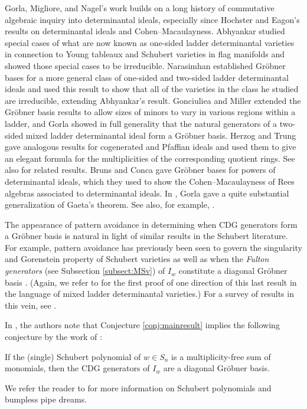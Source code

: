 \documentclass[ALCO,Unicode,published]{cedram}
\begin{document}
Gorla, Migliore, and Nagel's \cite{GMN13} work builds on a long history of commutative algebraic inquiry into determinantal ideals, especially since Hochster and Eagon's \cite{HE} results on determinantal ideals and Cohen--Macaulayness.  Abhyankar \cite{Abh88} studied special cases of what are now known as one-sided ladder determinantal varieties in connection to Young tableaux and Schubert varieties in flag manifolds and showed those special cases to be irreducible.  Narasimhan \cite{Nar86} established Gr\"obner bases for a more general class of one-sided and two-sided ladder determinantal ideals and used this result to show that all of the varieties in the class he studied are irreducible, extending Abhyankar's result.  Gonciuliea and Miller \cite{GM00}  extended the Gr\"obner basis results to allow sizes of minors to vary in various regions within a ladder, and Gorla \cite{Gor07} showed in full generality that the natural generators of a two-sided mixed ladder determinantal ideal form a Gr\"obner basis.  Herzog and Trung \cite{HT92} gave analogous results for cogenerated and Pfaffian ideals and used them to give an elegant formula for the multiplicities of the corresponding quotient rings.  
See also \cite{DNS11} for related results.  Bruns and Conca \cite{BC98} gave Gr\"obner bases for powers of determinantal ideals, which they used to show the Cohen--Macaulayness of Rees algebras associated to determinantal ideals.  In \cite{Gor08}, Gorla gave a quite substantial generalization of Gaeta's theorem.  See also, for example, \cite{Bru91,  CH97, Con98, BRW05}.

The appearance of pattern avoidance in determining when CDG generators form a Gr\"obner basis is natural in light of similar results in the Schubert literature.  For example, pattern avoidance has previously been seen to govern the singularity \cite{LS90} and Gorenstein property \cite{WY06} of Schubert varieties as well as when the \emph{Fulton generators} (see Subsection \ref{subsect:MSv}) of $I_w$ constitute a diagonal Gr\"obner basis \cite{KMY09}.  (Again, we refer to \cite{Gor07} for the first proof of one direction of this last result in the language of mixed ladder determinantal varieties.)  For a survey of results in this vein, see \cite{AB16}.

In \cite{HPW}, the authors note that Conjecture \ref{conj:mainresult} implies the following conjecture by the work of \cite{FMSD}: \begin{conjecture}\cite[Conjecture 7.2]{HPW}\label{conj:Schub}
If the \textup{(}single\textup{)} Schubert polynomial of $w \in S_n$ is a multiplicity-free sum of monomials, then the CDG generators of $I_w$ are a diagonal Gr\"obner basis.
\end{conjecture}
We refer the reader to \cite{HPW, Wei} for more information on Schubert polynomials and bumpless pipe dreams.
\end{document}
